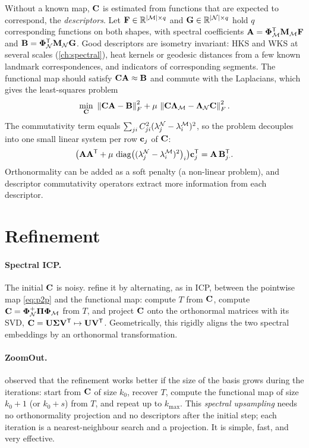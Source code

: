 Without a known map, $\mathbf{C}$ is estimated from functions that are expected to correspond, the
\emph{descriptors}. Let $\mathbf F\in\mathbb{R}^{\left\lvert \mathcal{M}\right\rvert\times q}$ and $\mathbf G\in\mathbb{R}^{\left\lvert \mathcal{N}\right\rvert\times q}$ hold $q$
corresponding functions on both shapes, with spectral coefficients $\mathbf{A}=\boldsymbol{\Phi}_{\mathcal{M}}^{\mathsf{T}}\mathbf{M}_{\mathcal{M}}\mathbf F$ and
$\mathbf{B}=\boldsymbol{\Phi}_{\mathcal{N}}^{\mathsf{T}}\mathbf{M}_{\mathcal{N}}\mathbf G$. Good descriptors are isometry invariant: HKS and WKS at several scales
(\cref{ch:spectral}), heat kernels or geodesic distances from a few known landmark correspondences,
and indicators of corresponding segments. The functional map should satisfy $\mathbf{C}\mathbf{A}\approx\mathbf{B}$ and
commute with the Laplacians, which gives the least-squares problem
\begin{equation}
\min_\mC\ \norm{\mC\mA-\mB}_F^2+\mu\,\norm{\mC\mLambda_\M-\mLambda_\NN\mC}_F^2 .
\end{equation}
The commutativity term equals $\sum_{ji}C_{ji}^2(\lambda^{\mathcal{N}}_j-\lambda^{\mathcal{M}}_i)^2$, so the problem
decouples into one small linear system per row $\mathbf{c}_j$ of $\mathbf{C}$:
\begin{equation}
\bigl(\mathbf{A}\mathbf{A}^{\mathsf{T}}+\mu\,\operatorname{diag}\bigl((\lambda_j^{\mathcal{N}}-\lambda_i^{\mathcal{M}})^2\bigr)_i\bigr)\mathbf{c}_j^{\mathsf{T}}=\mathbf{A}\,\mathbf{B}_{j\cdot}^{\mathsf{T}} .
\end{equation}
Orthonormality can be added as a soft penalty (a non-linear problem), and descriptor commutativity
operators \citep{Nogneng2017} extract more information from each descriptor.

\section{Refinement}

\paragraph{Spectral ICP.} The initial $\mathbf{C}$ is noisy. \citet{Ovsjanikov2012} refine it by alternating,
as in ICP, between the pointwise map \eqref{eq:p2p} and the functional map: compute $T$ from $\mathbf{C}$,
compute $\mathbf{C}=\boldsymbol{\Phi}_{\mathcal{N}}^+\boldsymbol{\Pi}\boldsymbol{\Phi}_{\mathcal{M}}$ from $T$, and project $\mathbf{C}$ onto the orthonormal matrices with its
SVD, $\mathbf{C}=\mathbf{U}\boldsymbol{\Sigma}\mathbf{V}^{\mathsf{T}}\mapsto\mathbf{U}\mathbf{V}^{\mathsf{T}}$. Geometrically, this rigidly aligns the two spectral
embeddings by an orthonormal transformation.

\paragraph{ZoomOut.} \citet{Melzi2019} observed that the refinement works better if the size of the
basis grows during the iterations: start from $\mathbf{C}$ of size $k_0$, recover $T$, compute the functional
map of size $k_0+1$ (or $k_0+s$) from $T$, and repeat up to $k_{\max}$. This \emph{spectral upsampling}
needs no orthonormality projection and no descriptors after the initial step; each iteration is a
nearest-neighbour search and a projection. It is simple, fast, and very effective.

